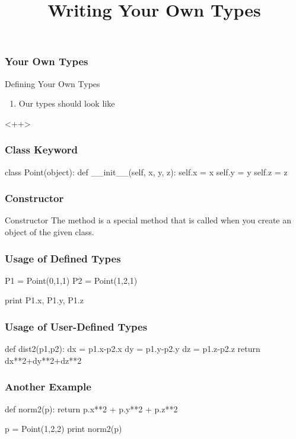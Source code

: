 
\title{Writing Your Own Types}


\begin{frame}[fragile] %
\frametitle{Your Own Types}

\begin{block}{Defining Your Own Types}
\begin{enumerate}
\item Our types should look like 
\end{enumerate}<++>
\end{block}

\end{frame}


\begin{frame}[fragile] %
\frametitle{Class Keyword}
\begin{python}
class Point(object):
    def __init__(self, x, y, z):
        self.x = x
        self.y = y
        self.z = z
\end{python}
\end{frame}

\begin{frame}[fragile] %
\frametitle{Constructor}

\begin{block}{Constructor}
The  method is a special method that is called when you create an object of the given class.
\end{block}
\end{frame}

\begin{frame}[fragile] %
\frametitle{Usage of Defined Types}
\begin{python}
P1 = Point(0,1,1)
P2 = Point(1,2,1)

print P1.x, P1.y, P1.z
\end{python}
\end{frame}

\begin{frame}[fragile] %
\frametitle{Usage of User-Defined Types}
\begin{python}
def dist2(p1,p2):
    dx = p1.x-p2.x
    dy = p1.y-p2.y
    dz = p1.z-p2.z
    return dx**2+dy**2+dz**2
\end{python}
\end{frame}

\begin{frame}[fragile] %
\frametitle{Another Example}
\begin{python}
def norm2(p):
    return p.x**2 + p.y**2 + p.z**2

p = Point(1,2,2)
print norm2(p)
\end{python}
\end{frame}

